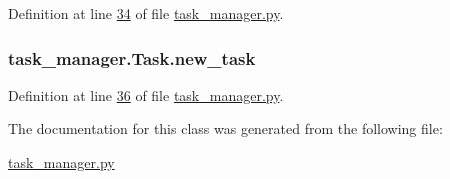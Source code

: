 Definition at line \hyperlink{task__manager_8py_source_l00034}{34} of file \hyperlink{task__manager_8py_source}{task\+\_\+manager.\+py}.

\hypertarget{classtask__manager_1_1Task_af16658f4c3c447e24f73ed3d1803e058}{
\subsubsection[{new\+\_\+task}]{\setlength{\rightskip}{0pt plus 5cm}task\+\_\+manager.\+Task.\+new\+\_\+task}}\label{classtask__manager_1_1Task_af16658f4c3c447e24f73ed3d1803e058}


Definition at line \hyperlink{task__manager_8py_source_l00036}{36} of file \hyperlink{task__manager_8py_source}{task\+\_\+manager.\+py}.



The documentation for this class was generated from the following file\+:\begin{DoxyCompactItemize}
\item 
\hyperlink{task__manager_8py}{task\+\_\+manager.\+py}\end{DoxyCompactItemize}
